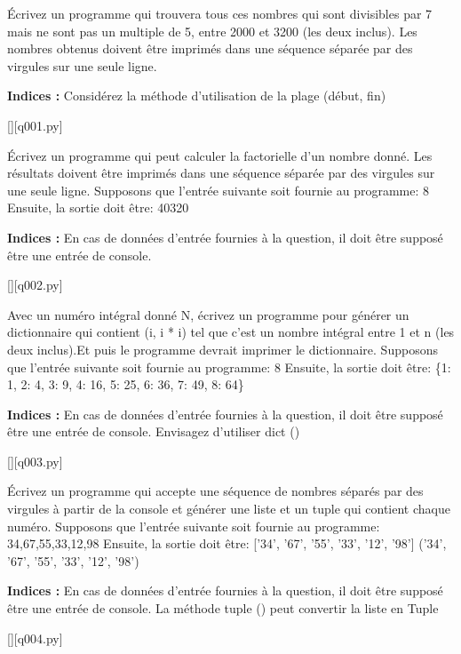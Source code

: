 
\question
Écrivez un programme qui trouvera tous ces nombres qui sont divisibles par 7 mais ne sont pas un multiple de 5,
entre 2000 et 3200 (les deux inclus).
Les nombres obtenus doivent être imprimés dans une séquence séparée par des virgules sur une seule ligne.
\par
\textbf{Indices : }Considérez la méthode d'utilisation de la plage (début, fin)
\renewcommand{\nomfichier}{q001.py}
\begin{solution}
    \pythonfile{\chemincode \nomfichier}[][q001.py]
\end{solution}


\question
Écrivez un programme qui peut calculer la factorielle d'un nombre donné.
Les résultats doivent être imprimés dans une séquence séparée par des virgules sur une seule ligne.
Supposons que l'entrée suivante soit fournie au programme:
8
Ensuite, la sortie doit être:
40320
\par
\textbf{Indices : }En cas de données d'entrée fournies à la question, il doit être supposé être une entrée de console.
\renewcommand{\nomfichier}{q002.py}
\begin{solution}
    \pythonfile{\chemincode \nomfichier}[][q002.py]
\end{solution}


\question
Avec un numéro intégral donné N, écrivez un programme pour générer un dictionnaire qui contient (i, i * i) tel que c'est un nombre intégral entre 1 et n (les deux inclus).Et puis le programme devrait imprimer le dictionnaire.
Supposons que l'entrée suivante soit fournie au programme:
8
Ensuite, la sortie doit être:
\{1: 1, 2: 4, 3: 9, 4: 16, 5: 25, 6: 36, 7: 49, 8: 64\}
\par
\textbf{Indices : }En cas de données d'entrée fournies à la question, il doit être supposé être une entrée de console.
Envisagez d'utiliser dict ()
\renewcommand{\nomfichier}{q003.py}
\begin{solution}
    \pythonfile{\chemincode \nomfichier}[][q003.py]
\end{solution}


\question
Écrivez un programme qui accepte une séquence de nombres séparés par des virgules à partir de la console et générer une liste et un tuple qui contient chaque numéro.
Supposons que l'entrée suivante soit fournie au programme:
34,67,55,33,12,98
Ensuite, la sortie doit être:
['34', '67', '55', '33', '12', '98']
('34', '67', '55', '33', '12', '98')
\par
\textbf{Indices : }En cas de données d'entrée fournies à la question, il doit être supposé être une entrée de console.
La méthode tuple () peut convertir la liste en Tuple
\renewcommand{\nomfichier}{q004.py}
\begin{solution}
    \pythonfile{\chemincode \nomfichier}[][q004.py]
\end{solution}


